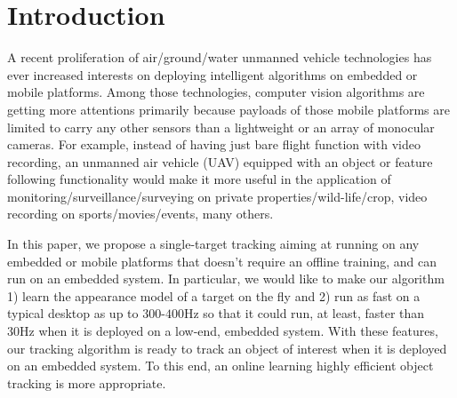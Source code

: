 \documentclass{bmvc2k}
\begin{document}
\section{Introduction}

A recent proliferation of air/ground/water unmanned vehicle
technologies has ever increased interests on deploying intelligent
algorithms on embedded or mobile platforms. Among those technologies,
computer vision algorithms are getting more attentions primarily
because payloads of those mobile platforms are limited to carry any
other sensors than a lightweight or an array of monocular cameras. For
example, instead of having just bare flight function with video
recording, an unmanned air vehicle (UAV) equipped with an object or
feature following functionality would make it more useful in the
application of monitoring/surveillance/surveying on private
properties/wild-life/crop, video recording on sports/movies/events,
many others.

In this paper, we propose a single-target tracking aiming at running
on any embedded or mobile platforms that doesn't require an offline
training, and can run on an embedded system. In particular, we would
like to make our algorithm 1) learn the appearance model of a target
on the fly and 2) run as fast on a typical desktop as up to $300$-$400$Hz so
that it could run, at least, faster than 30Hz when it is deployed on a
low-end, embedded system. With these features, our tracking algorithm
is ready to track an object of interest when it is deployed on an
embedded system. To this end, an online learning highly efficient object tracking is more
appropriate.
\end{document}
